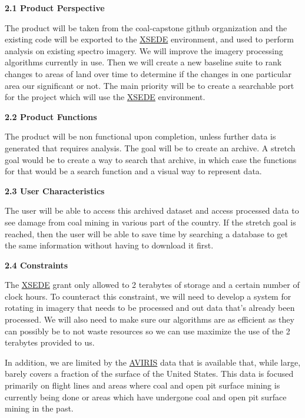 \documentclass[a4paper,12pt]{article}
\begin{document}
\noindent \textbf{2.1 Product Perspective}\newline


\noindent The product will be taken from the coal-capstone github organization and the existing code will be exported to the \href{https://www.xsede.org/}{XSEDE} environment, and used to perform analysis on existing spectro imagery. We will improve the imagery processing algorithms currently in use. Then we will create a new baseline suite to rank changes to areas of land over time to determine if the changes in one particular area our significant or not. The main priority will be to create a searchable port for the project which will use the \href{https://www.xsede.org/}{XSEDE} environment. \newline


\noindent \textbf{2.2 Product Functions}\newline


\noindent The product will be non functional upon completion, unless further data is generated that requires analysis. The goal will be to create an archive. A stretch goal would be to create a way to search that archive, in which case the functions for that would be a search function and a visual way to represent data. \newline


\noindent \textbf{2.3 User Characteristics}\newline


\noindent The user will be able to access this archived dataset and access processed data to see damage from coal mining in various part of the country. If the stretch goal is reached, then the user will be able to save time by searching a database to get the same information without having to download it first.\newline


\noindent \textbf{2.4 Constraints}\newline


\noindent The \href{https://www.xsede.org/}{XSEDE} grant only allowed to 2 terabytes of storage and a certain number of clock hours. To counteract this constraint, we will need to develop a system for rotating in imagery that needs to be processed and out data that's already been processed. We will also need to make sure our algorithms are as efficient as they can possibly be to not waste resources so we can use maximize the use of the 2 terabytes provided to us.\newline


\noindent In addition, we are limited by the \href{https://aviris.jpl.nasa.gov/}{AVIRIS} data that is available that, while large, barely covers a fraction of the surface of the United States. This data is focused primarily on flight lines and areas where coal and open pit surface mining is currently being done or areas which have undergone coal and open pit surface mining in the past. \newline
\end{document}
